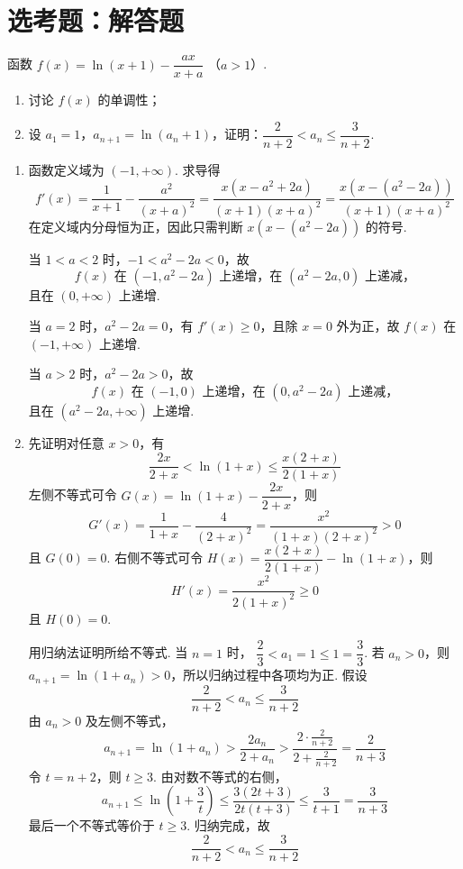 \section{选考题：解答题}

\begin{problem}
函数 \(f(x)=\ln(x+1)-\dfrac{ax}{x+a}\) （\(a>1\)）.

\begin{enumerate}
\item 讨论 \(f(x)\) 的单调性；
\item 设 \(a_{1}=1\)，\(a_{n+1}=\ln(a_{n}+1)\)，证明：\(\dfrac{2}{n+2}<a_{n}\leqslant \dfrac{3}{n+2}\).
\end{enumerate}
\begin{solution}
\begin{enumerate}
\item 函数定义域为 \((-1,+\infty)\). 求导得
\[
f'(x)=\frac1{x+1}-\frac{a^{2}}{(x+a)^{2}}
=\frac{x\left(x-a^{2}+2a\right)}{(x+1)(x+a)^{2}}
=\frac{x\left(x-(a^{2}-2a)\right)}{(x+1)(x+a)^{2}}
\]
在定义域内分母恒为正，因此只需判断
\(x\left(x-(a^{2}-2a)\right)\) 的符号.

当 \(1<a<2\) 时，\(-1<a^{2}-2a<0\)，故
\[
f(x)\text{ 在 }(-1,a^{2}-2a)\text{ 上递增，在 }(a^{2}-2a,0)\text{ 上递减，}
\]
且在 \((0,+\infty)\) 上递增.

当 \(a=2\) 时，\(a^{2}-2a=0\)，有 \(f'(x)\geqslant0\)，且除 \(x=0\) 外为正，故
\(f(x)\) 在 \((-1,+\infty)\) 上递增.

当 \(a>2\) 时，\(a^{2}-2a>0\)，故
\[
f(x)\text{ 在 }(-1,0)\text{ 上递增，在 }(0,a^{2}-2a)\text{ 上递减，}
\]
且在 \((a^{2}-2a,+\infty)\) 上递增.
\item 先证明对任意 \(x>0\)，有
\[
\frac{2x}{2+x}<\ln(1+x)\leqslant\frac{x(2+x)}{2(1+x)}
\]
左侧不等式可令
\(G(x)=\ln(1+x)-\dfrac{2x}{2+x}\)，则
\[
G'(x)=\frac1{1+x}-\frac4{(2+x)^{2}}
=\frac{x^{2}}{(1+x)(2+x)^{2}}>0
\]
且 \(G(0)=0\). 右侧不等式可令
\(H(x)=\dfrac{x(2+x)}{2(1+x)}-\ln(1+x)\)，则
\[
H'(x)=\frac{x^{2}}{2(1+x)^{2}}\geqslant0
\]
且 \(H(0)=0\).

用归纳法证明所给不等式. 当 \(n=1\) 时，
\(\dfrac23<a_{1}=1\leqslant1=\dfrac33\). 若 \(a_n>0\)，则
\(a_{n+1}=\ln(1+a_n)>0\)，所以归纳过程中各项均为正. 假设
\[
\frac2{n+2}<a_{n}\leqslant\frac3{n+2}
\]
由 \(a_{n}>0\) 及左侧不等式，
\[
a_{n+1}=\ln(1+a_{n})
>\frac{2a_{n}}{2+a_{n}}
>\frac{2\cdot\frac2{n+2}}{2+\frac2{n+2}}
=\frac2{n+3}
\]
令 \(t=n+2\)，则 \(t\geqslant3\). 由对数不等式的右侧，
\[
a_{n+1}\leqslant\ln\left(1+\frac3t\right)
\leqslant\frac{3(2t+3)}{2t(t+3)}
\leqslant\frac3{t+1}=\frac3{n+3}
\]
最后一个不等式等价于 \(t\geqslant3\). 归纳完成，故
\[
\frac2{n+2}<a_{n}\leqslant\frac3{n+2}
\]
\end{enumerate}
\end{solution}
\end{problem}
